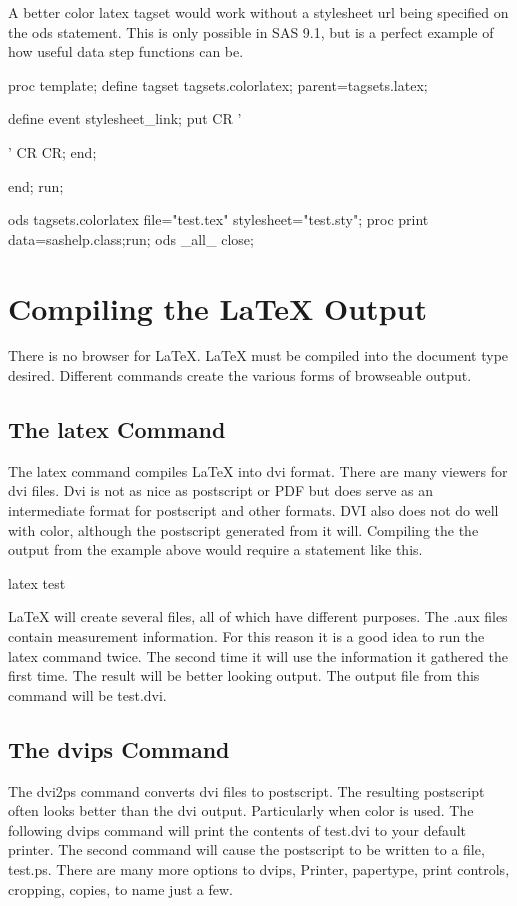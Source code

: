 A better color latex tagset would work without a stylesheet url
being specified on the ods statement.  This is only possible in
SAS 9.1, but is a perfect example of how useful data step functions
can be.

\begin{sfvcode}
proc template;
    define tagset tagsets.colorlatex; 
        parent=tagsets.latex;

        define event stylesheet_link;
            put CR '\usepackage[color]{';
            put scan(url, 1, '.');
            put '}' CR CR;
        end;

    end;
run;

ods tagsets.colorlatex file="test.tex" stylesheet="test.sty";
proc print data=sashelp.class;run;
ods _all_ close;
\end{sfvcode}

\section{Compiling the LaTeX Output}
There is no browser for LaTeX.  LaTeX must be compiled into the 
document type desired.  Different commands create the various forms
of browseable output.

\subsection{The latex Command}
The latex command compiles LaTeX into dvi format.  There are many
viewers for dvi files.  Dvi is not as nice as postscript or PDF
but does serve as an intermediate format for postscript and other
formats.  DVI also does not do well with color, although the postscript 
generated from it will.  Compiling the the output from the example above 
would require a statement like this.

\begin{sfvcode}
        latex test
\end{sfvcode}

LaTeX will create several files, all of which have different purposes. The
.aux files contain measurement information.  For this reason it is a good 
idea to run the latex command twice.  The second time it will use the information
it gathered the first time.  The result will be better looking output.  The
output file from this command will be test.dvi.

\subsection{The dvips Command}
The dvi2ps command converts dvi files to postscript.  The resulting postscript
often looks better than the dvi output.  Particularly when color
is used.  The following dvips command will print the contents of test.dvi to
your default printer.  The second command will cause the postscript to be
written to a file, test.ps.  There are many more options to dvips, Printer,
papertype, print controls, cropping, copies, to name just a few.

